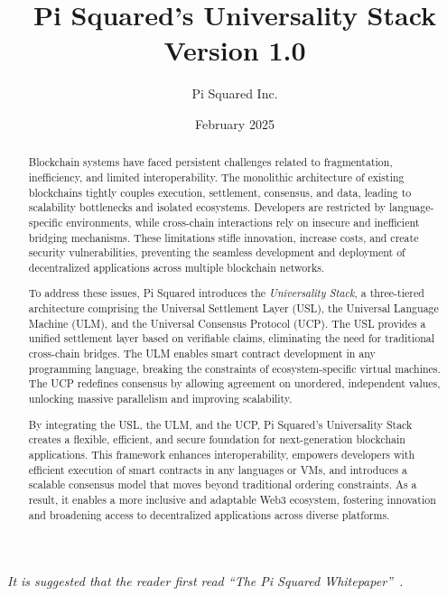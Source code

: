 \documentclass{article}
\title{Pi Squared's Universality Stack\\\Large Version 1.0}
\author{Pi Squared Inc.}
\date{February 2025}
\newcommand{\UC}{UCP}
\begin{document}
\maketitle

{\parbox{0.86\textwidth}{\small\em 
It is suggested that the reader first read ``The Pi Squared Whitepaper''~\cite{pi2paper}.
}}

\begin{abstract}
Blockchain systems have faced persistent challenges related to fragmentation, inefficiency, and limited interoperability. The monolithic architecture of existing blockchains tightly couples execution, settlement, consensus, and data, leading to scalability bottlenecks and isolated ecosystems. Developers are restricted by language-specific environments, while cross-chain interactions rely on insecure and inefficient bridging mechanisms. These limitations stifle innovation, increase costs, and create security vulnerabilities, preventing the seamless development and deployment of decentralized applications across multiple blockchain networks.

To address these issues, Pi Squared introduces the \textit{Universality Stack}, a three-tiered architecture comprising the Universal Settlement Layer (USL), the Universal Language Machine (ULM), and the Universal Consensus Protocol (\UC{}). The USL provides a unified settlement layer based on verifiable claims, eliminating the need for traditional cross-chain bridges. The ULM enables smart contract development in any programming language, breaking the constraints of ecosystem-specific virtual machines. The \UC{} redefines consensus by allowing agreement on unordered, independent values, unlocking massive parallelism and improving scalability.

By integrating the USL, the ULM, and the \UC{}, Pi Squared’s Universality Stack creates a flexible, efficient, and secure foundation for next-generation blockchain applications. This framework enhances interoperability, empowers developers with efficient execution of smart contracts in any languages or VMs, and introduces a scalable consensus model that moves beyond traditional ordering constraints. As a result, it enables a more inclusive and adaptable Web3 ecosystem, fostering innovation and broadening access to decentralized applications across diverse platforms.
\end{abstract}

\newpage

\renewcommand{\contentsname}{Table of Contents}
\tableofcontents
\end{document}
